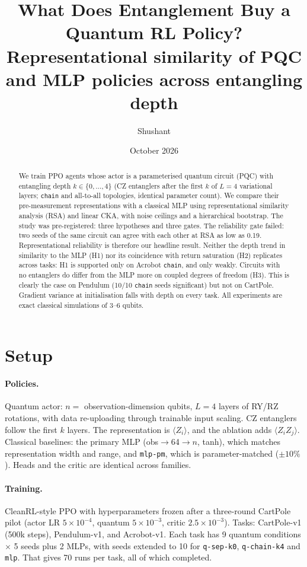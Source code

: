 \documentclass[11pt]{article}
\title{What Does Entanglement Buy a Quantum RL Policy?\\
\large Representational similarity of PQC and MLP policies across entangling depth}
\author{Shushant}
\date{October 2026}
\begin{document}
\maketitle

\begin{abstract}
We train PPO agents whose actor is a parameterised quantum circuit (PQC) with entangling depth
$k\in\{0,\dots,4\}$ (CZ entanglers after the first $k$ of $L=4$ variational layers; \texttt{chain} and
all-to-all topologies, identical parameter count). We compare their pre-measurement representations
with a classical MLP using representational similarity analysis (RSA) and linear CKA, with noise ceilings
and a hierarchical bootstrap. The study was pre-registered: three hypotheses and three gates.
The reliability gate failed: two seeds of the same circuit can agree with each other at RSA as low as 0.19.
Representational reliability is therefore our headline result. Neither the depth trend in similarity to the MLP (H1)
nor its coincidence with return saturation (H2) replicates across tasks: H1 is supported only on
Acrobot \texttt{chain}, and only weakly. Circuits with no entanglers do differ from the MLP more on coupled
degrees of freedom (H3). This is clearly the case on Pendulum (10/10 \texttt{chain} seeds significant)
but not on CartPole. Gradient variance at initialisation falls with depth on every task.
All experiments are exact classical simulations of 3--6 qubits.
\end{abstract}

\section{Setup}
\paragraph{Policies.} Quantum actor: $n=$ observation-dimension qubits, $L=4$ layers of RY/RZ rotations, with
data re-uploading through trainable input scaling. CZ entanglers follow the first $k$ layers. The representation is
$\langle Z_i\rangle$, and the ablation adds $\langle Z_iZ_j\rangle$. Classical baselines: the primary MLP
(obs$\to$64$\to n$, tanh), which matches representation width and range, and \texttt{mlp-pm}, which is parameter-matched ($\pm10\%$).
Heads and the critic are identical across families.
\paragraph{Training.} CleanRL-style PPO with hyperparameters frozen after a three-round CartPole pilot
(actor LR $5\times10^{-4}$, quantum $5\times10^{-3}$, critic $2.5\times10^{-3}$). Tasks: CartPole-v1 (500k steps),
Pendulum-v1, and Acrobot-v1. Each task has 9 quantum conditions $\times$ 5 seeds plus 2 MLPs, with seeds extended to 10 for
\texttt{q-sep-k0}, \texttt{q-chain-k4} and \texttt{mlp}. That gives 70 runs per task, all of which completed.
\end{document}
